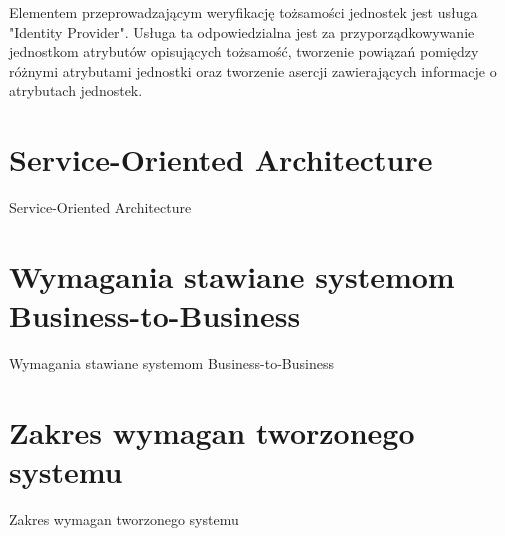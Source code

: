 Elementem przeprowadzającym weryfikację tożsamości jednostek jest usługa "Identity Provider". Usługa ta odpowiedzialna jest za przyporządkowywanie jednostkom atrybutów opisujących tożsamość, tworzenie powiązań pomiędzy różnymi atrybutami jednostki oraz tworzenie asercji zawierających informacje o atrybutach jednostek. 


\section{Service-Oriented Architecture}
\label{sec:soa}

Service-Oriented Architecture


\section{Wymagania stawiane systemom Business-to-Business}
\label{sec:wymaganiaB2B}

Wymagania stawiane systemom Business-to-Business


\section{Zakres wymagan tworzonego systemu}
\label{sec:zakresWymagan}

Zakres wymagan tworzonego systemu

